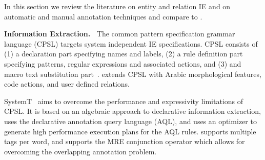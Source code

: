 In this section we review the literature on 
entity and relation IE and on automatic and manual annotation
techniques and compare to \framework.


\begin{table}[tb!]
\caption{Comaprison of IE system}
\label{tab:iecomp}
\end{table}

{\bf Information Extraction.~}
The common pattern specification grammar language (CPSL) targets system independent 
IE specifications. 
CPSL consists of 
(1) a declaration part specifying names and labels, 
(2) a rule definition part specifying patterns, regular expressions and associated actions, and 
(3) and macro text substitution part~\cite{appelt1998common}.
\framework extends CPSL with Arabic morphological features, code actions, and user defined relations.

SystemT~\cite{chiticariu2010systemt}
aims to overcome the performance and expressivity limitations of CPSL.
It is based on an algebraic approach to declarative information extraction,
uses the declarative annotation query language (AQL), and uses
an optimizer to generate high performance execution plans for the AQL rules. 
\framework supports multiple tags per word, and supports the MRE conjunction operator
which allows for overcoming the overlapping annotation problem. 

